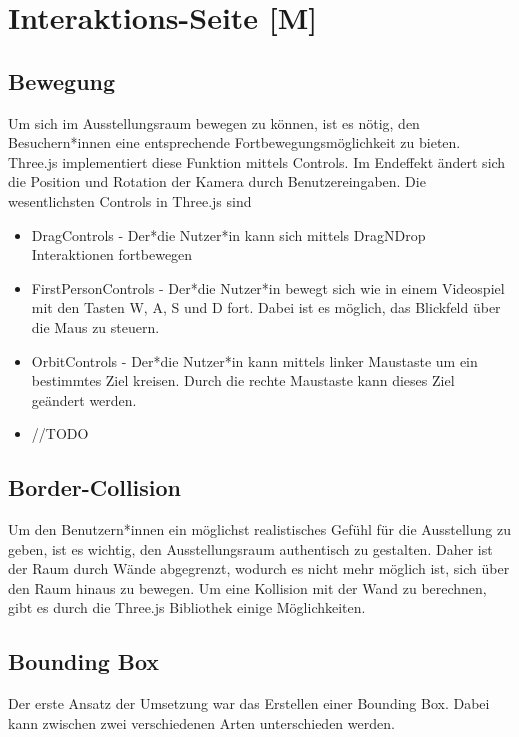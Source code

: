 \section{Interaktions-Seite [M]}

\subsection{Bewegung}
Um sich im Ausstellungsraum bewegen zu können, ist es nötig, den Besuchern*innen eine entsprechende Fortbewegungsmöglichkeit zu bieten. Three.js implementiert diese Funktion mittels Controls. Im Endeffekt ändert sich die Position und Rotation der Kamera durch Benutzereingaben. Die wesentlichsten Controls in Three.js sind

\begin{itemize}
    \item DragControls - Der*die Nutzer*in kann sich mittels DragNDrop Interaktionen fortbewegen \cite{DragControls}
    \item FirstPersonControls - Der*die Nutzer*in bewegt sich wie in einem Videospiel mit den Tasten W, A, S und D fort. Dabei ist es möglich, das Blickfeld über die Maus zu steuern. \cite{FirstPersonControls}
    \item OrbitControls - Der*die Nutzer*in kann mittels linker Maustaste um ein bestimmtes Ziel kreisen. Durch die rechte Maustaste kann dieses Ziel geändert werden. \cite{OrbitControls}
    \item //TODO
\end{itemize}


\subsection{Border-Collision}
Um den Benutzern*innen ein möglichst realistisches Gefühl für die Ausstellung zu geben, ist es wichtig, den Ausstellungsraum authentisch zu gestalten. Daher ist der Raum durch Wände abgegrenzt, wodurch es nicht mehr möglich ist, sich über den Raum hinaus zu bewegen. Um eine Kollision mit der Wand zu berechnen, gibt es durch die Three.js Bibliothek einige Möglichkeiten.

\subsection{Bounding Box}
Der erste Ansatz der Umsetzung war das Erstellen einer Bounding Box. Dabei kann zwischen zwei verschiedenen Arten unterschieden werden. 

